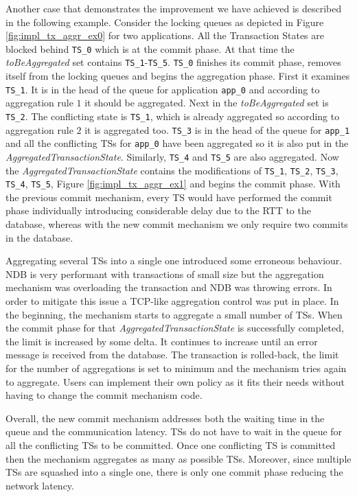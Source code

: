 Another case that demonstrates the improvement we have achieved is
described in the following example. Consider the locking queues as
depicted in Figure \ref{fig:impl_tx_aggr_ex0} for two applications. All the Transaction
States are blocked behind \texttt{TS\_0} which is at the commit
phase. At that time the \emph{toBeAggregated} set contains
\texttt{TS\_1}-\texttt{TS\_5}. \texttt{TS\_0} finishes its commit phase, removes
itself from the locking queues and begins the aggregation phase. First
it examines \texttt{TS\_1}. It is in the head of the queue for
application \texttt{app\_0} and according to aggregation rule $1$ it
should be aggregated. Next in the \emph{toBeAggregated} set is
\texttt{TS\_2}. The conflicting state is \texttt{TS\_1}, which is
already aggregated so according to aggregation rule $2$ it is
aggregated too. \texttt{TS\_3} is in the head of the queue for
\texttt{app\_1} and all the conflicting TSs for \texttt{app\_0} have
been aggregated so it is also put in the
\emph{AggregatedTransactionState}. Similarly, \texttt{TS\_4} and
\texttt{TS\_5} are also aggregated. Now the
\emph{AggregatedTransactionState} contains the modifications of
\texttt{TS\_1}, \texttt{TS\_2}, \texttt{TS\_3}, \texttt{TS\_4},
\texttt{TS\_5}, Figure \ref{fig:impl_tx_aggr_ex1} and begins the commit phase. With the previous commit
mechanism, every TS would have performed the commit phase individually introducing
considerable delay due to the RTT to the database, whereas with the
new commit mechanism we only require two commits in the database.

Aggregating several TSs into a single one introduced some erroneous
behaviour. NDB is very performant with transactions of small size but
the aggregation mechanism was overloading the transaction and NDB was
throwing errors. In order to mitigate this issue a TCP-like aggregation control
was put in place. In the beginning, the mechanism starts to aggregate
a small number of TSs. When the commit phase for that
\emph{AggregatedTransactionState} is successfully completed, the limit
is increased by some delta. It continues to increase until an error
message is received from the database. The transaction is rolled-back,
the limit for the number of aggregations is set to minimum and the
mechanism tries again to aggregate. Users can implement their own
policy as it fits their needs without having to change the commit
mechanism code.

Overall, the new commit mechanism addresses both the waiting time in
the queue and the communication latency. TSs do not have to wait in
the queue for all the conflicting TSs to be committed. Once one
conflicting TS is committed then the mechanism aggregates as many as
possible TSs. Moreover, since multiple TSs are squashed into a single
one, there is only one commit phase reducing the network latency.
